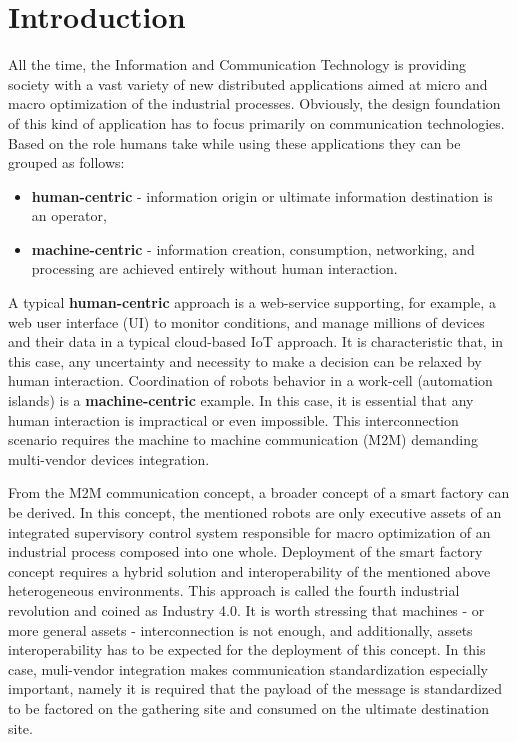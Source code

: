 \documentclass[
]{article}
\date{}
\providecommand{\tightlist}{%
  \setlength{\itemsep}{0pt}\setlength{\parskip}{0pt}}
\begin{document}
\hypertarget{introduction}{%
\section{Introduction}\label{introduction}}

All the time, the Information and Communication Technology is providing
society with a vast variety of new distributed applications aimed at
micro and macro optimization of the industrial processes. Obviously, the
design foundation of this kind of application has to focus primarily on
communication technologies. Based on the role humans take while using
these applications they can be grouped as follows:

\begin{itemize}
\tightlist
\item
  \textbf{human-centric} - information origin or ultimate information
  destination is an operator,
\item
  \textbf{machine-centric} - information creation, consumption,
  networking, and processing are achieved entirely without human
  interaction.
\end{itemize}

A typical \textbf{human-centric} approach is a web-service supporting,
for example, a web user interface (UI) to monitor conditions, and manage
millions of devices and their data in a typical cloud-based IoT
approach. It is characteristic that, in this case, any uncertainty and
necessity to make a decision can be relaxed by human interaction.
Coordination of robots behavior in a work-cell (automation islands) is a
\textbf{machine-centric} example. In this case, it is essential that any
human interaction is impractical or even impossible. This
interconnection scenario requires the machine to machine communication
(M2M) demanding multi-vendor devices integration.

From the M2M communication concept, a broader concept of a smart factory
can be derived. In this concept, the mentioned robots are only executive
assets of an integrated supervisory control system responsible for macro
optimization of an industrial process composed into one whole.
Deployment of the smart factory concept requires a hybrid solution and
interoperability of the mentioned above heterogeneous environments. This
approach is called the fourth industrial revolution and coined as
Industry 4.0. It is worth stressing that machines - or more general
assets - interconnection is not enough, and additionally, assets
interoperability has to be expected for the deployment of this concept.
In this case, muli-vendor integration makes communication
standardization especially important, namely it is required that the
payload of the message is standardized to be factored on the gathering
site and consumed on the ultimate destination site.
\end{document}
